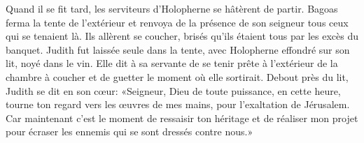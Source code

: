 Quand il se fit tard, les serviteurs d’Holopherne se hâtèrent de partir.
Bagoas ferma la tente de l’extérieur
	et renvoya de la présence de son seigneur tous ceux qui se tenaient là.
Ils allèrent se coucher, brisés qu’ils étaient tous par les excès du banquet.
Judith fut laissée seule dans la tente,
	avec Holopherne effondré sur son lit, noyé dans le vin.
Elle dit à sa servante de se tenir prête à l’extérieur de la chambre à coucher
	et de guetter le moment où elle sortirait.
Debout près du lit, Judith se dit en son cœur:
	«Seigneur, Dieu de toute puissance,
	en cette heure, tourne ton regard vers les œuvres de mes mains,
	pour l’exaltation de Jérusalem.
Car maintenant c’est le moment de ressaisir ton héritage et de réaliser mon projet
	pour écraser les ennemis qui se sont dressés contre nous.»
